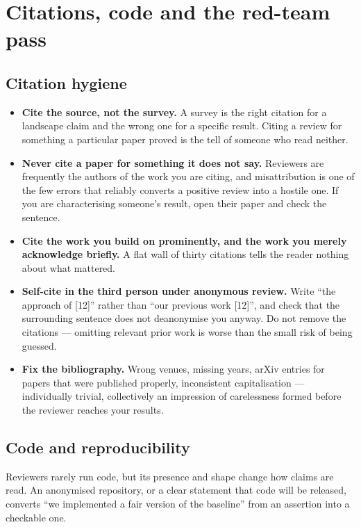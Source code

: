 \documentclass[11pt,a4paper]{article}
\begin{document}
\section{Citations, code and the red-team pass}

\subsection*{Citation hygiene}

\begin{itemize}
  \item \textbf{Cite the source, not the survey.} A survey is the right
    citation for a landscape claim and the wrong one for a specific result.
    Citing a review for something a particular paper proved is the tell of
    someone who read neither.
  \item \textbf{Never cite a paper for something it does not say.} Reviewers
    are frequently the authors of the work you are citing, and misattribution
    is one of the few errors that reliably converts a positive review into a
    hostile one. If you are characterising someone's result, open their paper
    and check the sentence.
  \item \textbf{Cite the work you build on prominently, and the work you
    merely acknowledge briefly.} A flat wall of thirty citations tells the
    reader nothing about what mattered.
  \item \textbf{Self-cite in the third person under anonymous review.} Write
    ``the approach of [12]'' rather than ``our previous work [12]'', and check
    that the surrounding sentence does not deanonymise you anyway. Do not
    remove the citations --- omitting relevant prior work is worse than the
    small risk of being guessed.
  \item \textbf{Fix the bibliography.} Wrong venues, missing years, arXiv
    entries for papers that were published properly, inconsistent
    capitalisation --- individually trivial, collectively an impression of
    carelessness formed before the reviewer reaches your results.
\end{itemize}

\subsection*{Code and reproducibility}

Reviewers rarely run code, but its presence and shape change how claims are
read. An anonymised repository, or a clear statement that code will be
released, converts ``we implemented a fair version of the baseline'' from an
assertion into a checkable one.
\end{document}
